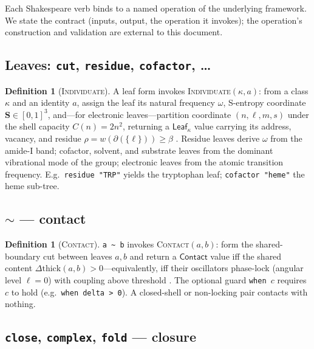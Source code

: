\documentclass[11pt,a4paper]{article}
\theoremstyle{thmstyle}
\theoremstyle{definition}
\newtheorem{definition}[theorem]{Definition}
\theoremstyle{remark}
\newcommand{\flo}{\beta}
\newcommand{\res}{\rho}
\newcommand{\cut}{\partial}
\newcommand{\shk}[1]{\texttt{#1}}
\begin{document}
Each Shakespeare verb binds to a named operation of the underlying
framework. We state the contract (inputs, output, the operation it
invokes); the operation's construction and validation are external to this
document.

\subsection{\texorpdfstring{Leaves: \shk{cut}, \shk{residue}, \shk{cofactor}, \ldots}{Leaves}}
\label{sec:stdlib-leaf}

\begin{definition}[\textsc{Individuate}]
\label{def:individuate}
A leaf form invokes \textsc{Individuate}$(\kappa,a)$: from a class $\kappa$
and an identity $a$, assign the leaf its natural frequency $\omega$,
S-entropy coordinate $\mathbf{S}\in[0,1]^3$, and---for electronic
leaves---partition coordinate $(n,\ell,m,s)$ under the shell capacity
$C(n)=2n^2$, returning a $\mathsf{Leaf}_\kappa$ value carrying its address,
vacancy, and residue $\res=w(\cut(\{\ell\}))\ge\flo$
\citep{sachikonye2025expralg,sachikonye2025chem}. Residue leaves derive
$\omega$ from the amide-I band; cofactor, solvent, and substrate leaves
from the dominant vibrational mode of the group; electronic leaves from the
atomic transition frequency. E.g.\ \shk{residue\ "TRP"} yields the
tryptophan leaf; \shk{cofactor\ "heme"} the heme sub-tree.
\end{definition}

\subsection{\texorpdfstring{\shk{$\sim$} --- contact}{Contact}}
\label{sec:stdlib-contact}

\begin{definition}[\textsc{Contact}]
\label{def:contact}
\shk{a\ \~{}\ b} invokes \textsc{Contact}$(a,b)$: form the shared-boundary
cut between leaves $a,b$ and return a $\mathsf{Contact}$ value iff the
shared content $\Delta\mathrm{thick}(a,b)>0$---equivalently, iff their
oscillators phase-lock (angular level $\ell=0$) with coupling above
threshold \citep{sachikonye2025fold,sachikonye2025chem}. The optional guard
\shk{when\ }$c$ requires $c$ to hold (e.g.\ \shk{when\ delta\ >\ 0}). A
closed-shell or non-locking pair contacts with nothing.
\end{definition}

\subsection{\texorpdfstring{\shk{close}, \shk{complex}, \shk{fold} --- closure}{Closure}}
\label{sec:stdlib-fold}
\end{document}
